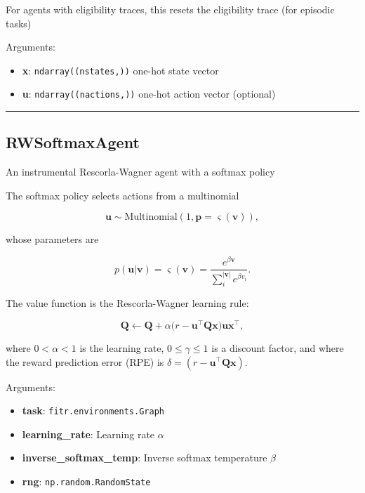 For agents with eligibility traces, this resets the eligibility trace
(for episodic tasks)

Arguments:

\begin{itemize}
\tightlist
\item
  \textbf{x}: \texttt{ndarray((nstates,))} one-hot state vector
\item
  \textbf{u}: \texttt{ndarray((nactions,))} one-hot action vector
  (optional)
\end{itemize}

\begin{center}\rule{0.5\linewidth}{\linethickness}\end{center}

\subsection{RWSoftmaxAgent}\label{rwsoftmaxagent}

\begin{Shaded}
\begin{Highlighting}[]
\end{Highlighting}
\end{Shaded}

An instrumental Rescorla-Wagner agent with a softmax policy

The softmax policy selects actions from a multinomial

\[
\mathbf u \sim \mathrm{Multinomial}(1, \mathbf p=\varsigma(\mathbf v)),
\]

whose parameters are

\[
p(\mathbf u|\mathbf v) = \varsigma(\mathbf v) = \frac{e^{\beta \mathbf v}}{\sum_{i}^{|\mathbf v|} e^{\beta v_i}}.
\]

The value function is the Rescorla-Wagner learning rule:

\[
\mathbf Q \gets \mathbf Q + \alpha \big(r - \mathbf u^\top \mathbf Q \mathbf x \big) \mathbf u \mathbf x^\top,
\]

where \(0 < \alpha < 1\) is the learning rate, \(0 \leq \gamma \leq 1\)
is a discount factor, and where the reward prediction error (RPE) is
\(\delta = (r - \mathbf u^\top \mathbf Q \mathbf x)\).

Arguments:

\begin{itemize}
\tightlist
\item
  \textbf{task}: \texttt{fitr.environments.Graph}
\item
  \textbf{learning\_rate}: Learning rate \(\alpha\)
\item
  \textbf{inverse\_softmax\_temp}: Inverse softmax temperature \(\beta\)
\item
  \textbf{rng}: \texttt{np.random.RandomState}
\end{itemize}

